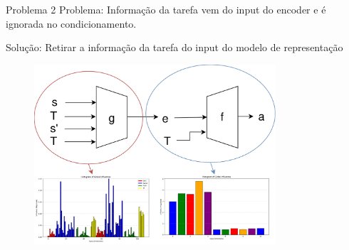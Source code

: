\begin{frame}{Problema 2}
    Problema: Informação da tarefa vem do input do encoder e é ignorada no condicionamento.

    Solução: Retirar a informação da tarefa do input do modelo de representação 

    \begin{figure}
        \centering
        \vspace{-10pt}
        \includegraphics[width=0.8\textwidth]{img/sacaar_ig.png}
    \end{figure}
\end{frame}
